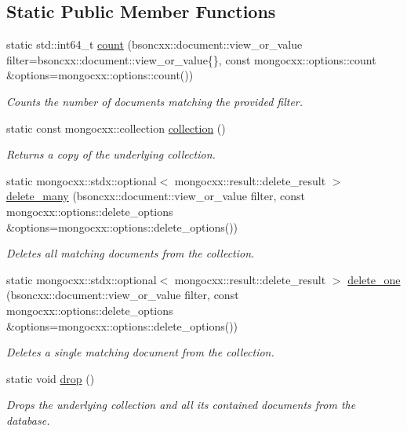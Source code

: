 \subsection*{Static Public Member Functions}
\begin{DoxyCompactItemize}
\item 
static std\+::int64\+\_\+t \hyperlink{classmangrove_1_1model_a4dac6424aa52c96fc184926f00570836}{count} (bsoncxx\+::document\+::view\+\_\+or\+\_\+value filter=bsoncxx\+::document\+::view\+\_\+or\+\_\+value\{\}, const mongocxx\+::options\+::count \&options=mongocxx\+::options\+::count())
\begin{DoxyCompactList}\small\item\em Counts the number of documents matching the provided filter. \end{DoxyCompactList}\item 
static const mongocxx\+::collection \hyperlink{classmangrove_1_1model_a0d52a9bedf4808ef8cc98f02a9e9083b}{collection} ()
\begin{DoxyCompactList}\small\item\em Returns a copy of the underlying collection. \end{DoxyCompactList}\item 
static mongocxx\+::stdx\+::optional$<$ mongocxx\+::result\+::delete\+\_\+result $>$ \hyperlink{classmangrove_1_1model_ada372a128865c770d7b2334990ad6f5f}{delete\+\_\+many} (bsoncxx\+::document\+::view\+\_\+or\+\_\+value filter, const mongocxx\+::options\+::delete\+\_\+options \&options=mongocxx\+::options\+::delete\+\_\+options())
\begin{DoxyCompactList}\small\item\em Deletes all matching documents from the collection. \end{DoxyCompactList}\item 
static mongocxx\+::stdx\+::optional$<$ mongocxx\+::result\+::delete\+\_\+result $>$ \hyperlink{classmangrove_1_1model_a18e41c79c88891dcfaea88e3cc6df09c}{delete\+\_\+one} (bsoncxx\+::document\+::view\+\_\+or\+\_\+value filter, const mongocxx\+::options\+::delete\+\_\+options \&options=mongocxx\+::options\+::delete\+\_\+options())
\begin{DoxyCompactList}\small\item\em Deletes a single matching document from the collection. \end{DoxyCompactList}\item 
static void \hyperlink{classmangrove_1_1model_a14472adea853a46b9e76aef6cb2cd246}{drop} ()
\begin{DoxyCompactList}\small\item\em Drops the underlying collection and all its contained documents from the database. \end{DoxyCompactList}\item 

\end{DoxyCompactItemize}
